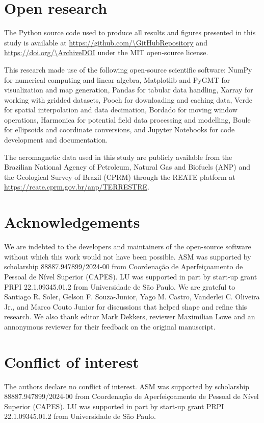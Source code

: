 \section*{Open research}

The Python source code used to produce all results and figures presented in this
study is available at \url{https://github.com/\GitHubRepository} and
\url{https://doi.org/\ArchiveDOI} under the MIT open-source license.

This research made use of the following open-source scientific software:
NumPy \citep{Harris2020} for numerical computing and linear algebra,
Matplotlib \citep{Hunter2007} and PyGMT \citep{PyGMT2026} for visualization and map
generation, Pandas \citep{pandas} for tabular data handling,
Xarray \citep{Hoyer2017} for working with gridded datasets,
Pooch \citep{Uieda2020} for downloading and caching data,
Verde \citep{Uieda2018} for spatial interpolation and data decimation,
Bordado \citep{bordado} for moving window operations,
Harmonica \citep{Harmonica2024} for potential field data
processing and modelling,
Boule \citep{boule} for ellipsoids and coordinate conversions,
and
Jupyter Notebooks \citep{Granger2021,KluyverThomas2016} for code development and documentation.

The aeromagnetic data used in this study are publicly available from the
Brazilian National Agency of Petroleum, Natural Gas and Biofuels (ANP) and the
Geological Survey of Brazil (CPRM) through the REATE platform at
\url{https://reate.cprm.gov.br/anp/TERRESTRE}.


\section*{Acknowledgements}

We are indebted to the developers and maintainers of the open-source software
without which this work would not have been possible.
ASM was supported by scholarship 88887.947899/2024-00 from Coordenação de
Aperfeiçoamento de Pessoal de Nível Superior (CAPES).
LU was supported in part by start-up grant PRPI 22.1.09345.01.2 from
Universidade de São Paulo.
We are grateful to Santiago R. Soler, Gelson F. Souza-Junior, Yago M. Castro,
Vanderlei C. Oliveira Jr., and Marco Couto Junior for discussions that helped
shape and refine this research.
We also thank editor Mark Dekkers, reviewer Maximilian Lowe and an annonymous reviewer 
for their feedback on the original manuscript.

\section*{Conflict of interest}

The authors declare no conflict of interest.
ASM was supported by scholarship 88887.947899/2024-00 from Coordenação de
Aperfeiçoamento de Pessoal de Nível Superior (CAPES).
LU was supported in part by start-up grant PRPI 22.1.09345.01.2 from
Universidade de São Paulo.